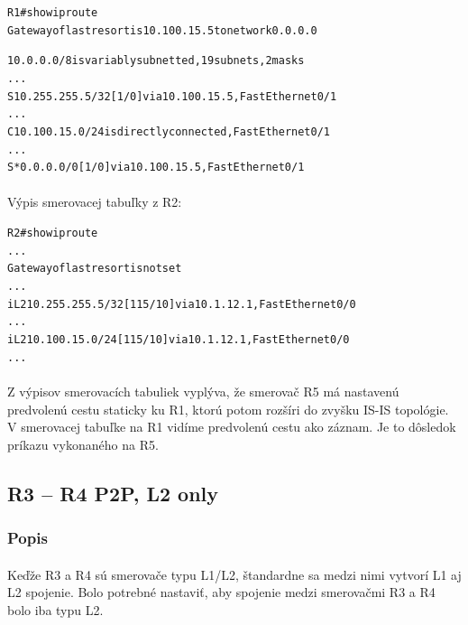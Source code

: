 \documentclass[12pt,twoside,a4paper]{report}
\begin{document}
\noindent
{\selectfont
\begin{small}
\begin{alltt}
R1#show ip route
Gateway of last resort is 10.100.15.5 to network 0.0.0.0

     10.0.0.0/8 is variably subnetted, 19 subnets, 2 masks
...
S       10.255.255.5/32 [1/0] via 10.100.15.5, FastEthernet0/1
...
C       10.100.15.0/24 is directly connected, FastEthernet0/1
...
S*   0.0.0.0/0 [1/0] via 10.100.15.5, FastEthernet0/1
\end{alltt}
\end{small}
}

\paragraph{}
Výpis smerovacej tabuľky z R2:

\noindent
{\selectfont
\begin{small}
\begin{alltt}
R2#show ip route
...
Gateway of last resort is not set
...
i L2    10.255.255.5/32 [115/10] via 10.1.12.1, FastEthernet0/0
...
i L2    10.100.15.0/24 [115/10] via 10.1.12.1, FastEthernet0/0
...
\end{alltt}
\end{small}
}

\paragraph{}
Z výpisov smerovacích tabuliek vyplýva, že smerovač R5 má nastavenú predvolenú cestu staticky ku R1, ktorú potom rozšíri do zvyšku IS-IS topológie. V smerovacej tabuľke na R1 vidíme predvolenú cestu ako  záznam. Je to dôsledok príkazu  vykonaného na R5.











\subsection{R3 – R4 P2P, L2 only}
\subsubsection{Popis}
\paragraph{}
Keďže R3 a R4 sú smerovače typu L1/L2, štandardne sa medzi nimi vytvorí L1 aj L2 spojenie. Bolo potrebné nastaviť, aby spojenie medzi smerovačmi R3 a R4 bolo iba typu L2.
\end{document}
